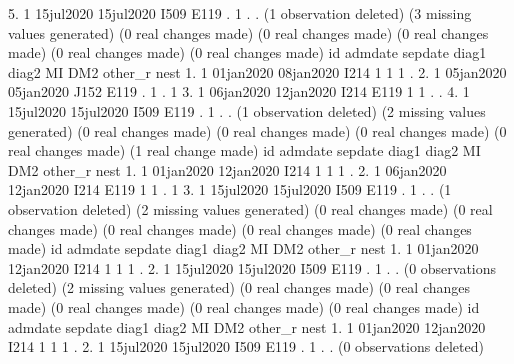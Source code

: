   5. {\VBAR}  1   15jul2020   15jul2020    I509    E119    .     1          .      . {\VBAR}
     {\BLC}
(1 observation deleted)
(3 missing values generated)
(0 real changes made)
(0 real changes made)
(0 real changes made)
(0 real changes made)
(0 real changes made)
{\smallskip}
     {\TLC}
     {\VBAR} id     admdate     sepdate   diag1   diag2   MI   DM2   other_{\tytilde}r   nest {\VBAR}
     {\LFTT}
  1. {\VBAR}  1   01jan2020   08jan2020    I214            1     1          1      . {\VBAR}
  2. {\VBAR}  1   05jan2020   05jan2020    J152    E119    .     1          .      1 {\VBAR}
  3. {\VBAR}  1   06jan2020   12jan2020    I214    E119    1     1          .      . {\VBAR}
  4. {\VBAR}  1   15jul2020   15jul2020    I509    E119    .     1          .      . {\VBAR}
     {\BLC}
(1 observation deleted)
(2 missing values generated)
(0 real changes made)
(0 real changes made)
(0 real changes made)
(0 real changes made)
(1 real change made)
{\smallskip}
     {\TLC}
     {\VBAR} id     admdate     sepdate   diag1   diag2   MI   DM2   other_{\tytilde}r   nest {\VBAR}
     {\LFTT}
  1. {\VBAR}  1   01jan2020   12jan2020    I214            1     1          1      . {\VBAR}
  2. {\VBAR}  1   06jan2020   12jan2020    I214    E119    1     1          .      1 {\VBAR}
  3. {\VBAR}  1   15jul2020   15jul2020    I509    E119    .     1          .      . {\VBAR}
     {\BLC}
(1 observation deleted)
(2 missing values generated)
(0 real changes made)
(0 real changes made)
(0 real changes made)
(0 real changes made)
(0 real changes made)
{\smallskip}
     {\TLC}
     {\VBAR} id     admdate     sepdate   diag1   diag2   MI   DM2   other_{\tytilde}r   nest {\VBAR}
     {\LFTT}
  1. {\VBAR}  1   01jan2020   12jan2020    I214            1     1          1      . {\VBAR}
  2. {\VBAR}  1   15jul2020   15jul2020    I509    E119    .     1          .      . {\VBAR}
     {\BLC}
(0 observations deleted)
(2 missing values generated)
(0 real changes made)
(0 real changes made)
(0 real changes made)
(0 real changes made)
(0 real changes made)
{\smallskip}
     {\TLC}
     {\VBAR} id     admdate     sepdate   diag1   diag2   MI   DM2   other_{\tytilde}r   nest {\VBAR}
     {\LFTT}
  1. {\VBAR}  1   01jan2020   12jan2020    I214            1     1          1      . {\VBAR}
  2. {\VBAR}  1   15jul2020   15jul2020    I509    E119    .     1          .      . {\VBAR}
     {\BLC}
(0 observations deleted)
{\smallskip}
